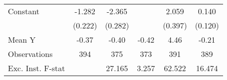 {\begin{tabular}{l*{5}{c}}
\addlinespace
Constant            &      -1.282\sym{***}&      -2.365\sym{***}&                     &       2.059\sym{***}&       0.140         \\
                    &     (0.222)         &     (0.282)         &                     &     (0.397)         &     (0.120)         \\
\midrule
Mean Y              &       -0.37         &       -0.40         &       -0.42         &        4.46         &       -0.21         \\
Observations        &         394         &         375         &         373         &         391         &         389         \\
Exc. Inst. F-stat   &                     &      27.165         &       3.257         &      62.522         &      16.474         \\
\bottomrule
\end{tabular}
}
